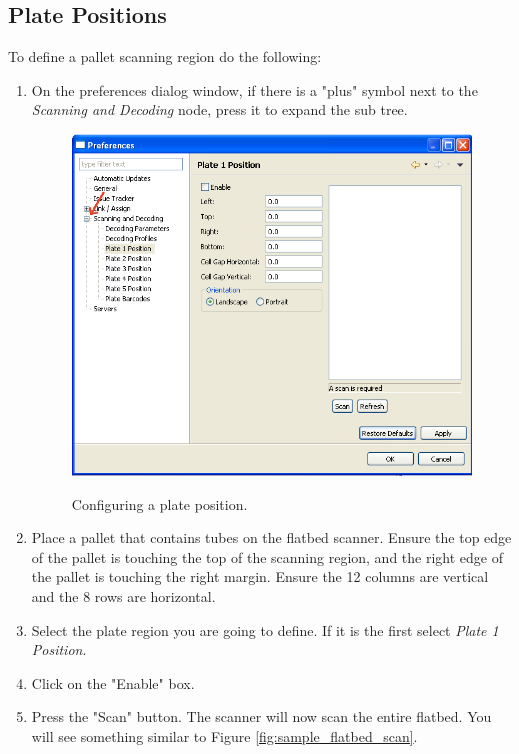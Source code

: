 \subsection{Plate Positions}
To define a pallet scanning region do the following:
\begin{enumerate}
  \item On the preferences dialog window, if there is a "plus" symbol next to
    the \emph{Scanning and Decoding} node, press it to expand the sub
    tree.
    \begin{figure}[H]
      \centering
      \scalebox{0.5}
      { \includegraphics*{screenshots/configuration/plate1_definition} }
      \caption{Configuring a plate position.}
      \label{fig:plate1_definition}
    \end{figure}
  \item Place a pallet that contains tubes on the flatbed scanner. Ensure the
    top edge of the pallet is touching the top of the scanning region, and the right
    edge of the pallet is touching the right margin. Ensure the 12 columns
    are vertical and the 8 rows are horizontal.
  \item Select the plate region you are going to define.  If it is the first
    select \emph{Plate 1 Position}.
  \item Click on the "Enable" box.
  \item Press the "Scan" button. The scanner will now scan the entire
    flatbed. You will see something similar to Figure \ref{fig:sample_flatbed_scan}.

\end{enumerate}
